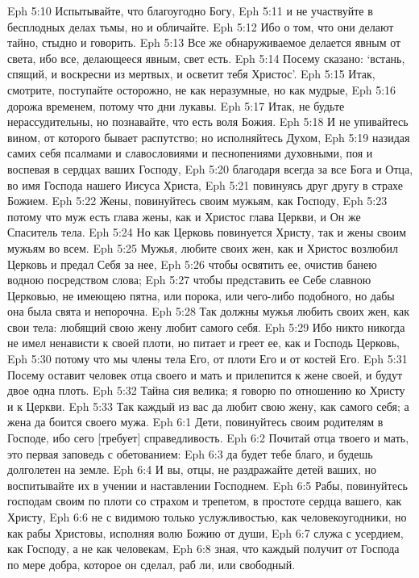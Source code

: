 Eph 5:10  Испытывайте, что благоугодно Богу,
Eph 5:11  и не участвуйте в бесплодных делах тьмы, но и обличайте.
Eph 5:12  Ибо о том, что они делают тайно, стыдно и говорить.
Eph 5:13  Все же обнаруживаемое делается явным от света, ибо все, делающееся явным, свет есть.
Eph 5:14  Посему сказано: `встань, спящий, и воскресни из мертвых, и осветит тебя Христос'.
Eph 5:15  Итак, смотрите, поступайте осторожно, не как неразумные, но как мудрые,
Eph 5:16  дорожа временем, потому что дни лукавы.
Eph 5:17  Итак, не будьте нерассудительны, но познавайте, что есть воля Божия.
Eph 5:18  И не упивайтесь вином, от которого бывает распутство; но исполняйтесь Духом,
Eph 5:19  назидая самих себя псалмами и славословиями и песнопениями духовными, поя и воспевая в сердцах ваших Господу,
Eph 5:20  благодаря всегда за все Бога и Отца, во имя Господа нашего Иисуса Христа,
Eph 5:21  повинуясь друг другу в страхе Божием.
Eph 5:22  Жены, повинуйтесь своим мужьям, как Господу,
Eph 5:23  потому что муж есть глава жены, как и Христос глава Церкви, и Он же Спаситель тела.
Eph 5:24  Но как Церковь повинуется Христу, так и жены своим мужьям во всем.
Eph 5:25  Мужья, любите своих жен, как и Христос возлюбил Церковь и предал Себя за нее,
Eph 5:26  чтобы освятить ее, очистив банею водною посредством слова;
Eph 5:27  чтобы представить ее Себе славною Церковью, не имеющею пятна, или порока, или чего-либо подобного, но дабы она была свята и непорочна.
Eph 5:28  Так должны мужья любить своих жен, как свои тела: любящий свою жену любит самого себя.
Eph 5:29  Ибо никто никогда не имел ненависти к своей плоти, но питает и греет ее, как и Господь Церковь,
Eph 5:30  потому что мы члены тела Его, от плоти Его и от костей Его.
Eph 5:31  Посему оставит человек отца своего и мать и прилепится к жене своей, и будут двое одна плоть.
Eph 5:32  Тайна сия велика; я говорю по отношению ко Христу и к Церкви.
Eph 5:33  Так каждый из вас да любит свою жену, как самого себя; а жена да боится своего мужа.
Eph 6:1  Дети, повинуйтесь своим родителям в Господе, ибо сего [требует] справедливость.
Eph 6:2  Почитай отца твоего и мать, это первая заповедь с обетованием:
Eph 6:3  да будет тебе благо, и будешь долголетен на земле.
Eph 6:4  И вы, отцы, не раздражайте детей ваших, но воспитывайте их в учении и наставлении Господнем.
Eph 6:5  Рабы, повинуйтесь господам своим по плоти со страхом и трепетом, в простоте сердца вашего, как Христу,
Eph 6:6  не с видимою только услужливостью, как человекоугодники, но как рабы Христовы, исполняя волю Божию от души,
Eph 6:7  служа с усердием, как Господу, а не как человекам,
Eph 6:8  зная, что каждый получит от Господа по мере добра, которое он сделал, раб ли, или свободный.
